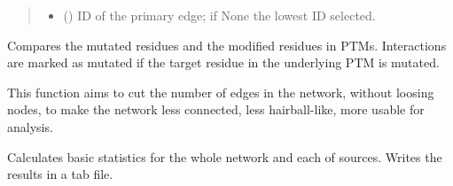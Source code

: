 \documentclass[letterpaper,10pt,english]{sphinxmanual}
\begin{document}
\begin{fulllineitems}
\begin{fulllineitems}
\begin{quote}
\begin{description}
\begin{itemize}
\item {} 
 () \textendash{} ID of the primary edge;
if None the lowest ID selected.

\end{itemize}

\end{description}\end{quote}

\end{fulllineitems}


\begin{fulllineitems}
\label{\detokenize{main:pypath.main.PyPath.mimp_directions}}
\end{fulllineitems}


\begin{fulllineitems}
\label{\detokenize{main:pypath.main.PyPath.mutated_edges}}
Compares the mutated residues and the modified residues in PTMs.
Interactions are marked as mutated if the target residue in the
underlying PTM is mutated.

\end{fulllineitems}


\begin{fulllineitems}
\label{\detokenize{main:pypath.main.PyPath.network_filter}}
This function aims to cut the number of edges in the network,
without loosing nodes, to make the network less connected,
less hairball-like, more usable for analysis.

\end{fulllineitems}


\begin{fulllineitems}
\label{\detokenize{main:pypath.main.PyPath.network_stats}}
Calculates basic statistics for the whole network
and each of sources. Writes the results in a tab file.


\end{fulllineitems}
\end{fulllineitems}
\end{document}
